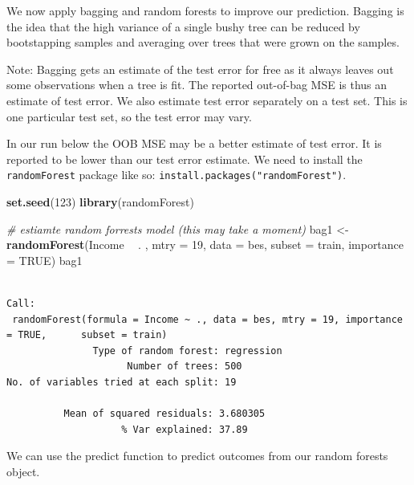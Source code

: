 \documentclass[]{article}
\newenvironment{Shaded}{\begin{snugshade}}{\end{snugshade}}
\newcommand{\CommentTok}[1]{\textcolor[rgb]{0.56,0.35,0.01}{\textit{#1}}}
\newcommand{\DataTypeTok}[1]{\textcolor[rgb]{0.13,0.29,0.53}{#1}}
\newcommand{\DecValTok}[1]{\textcolor[rgb]{0.00,0.00,0.81}{#1}}
\newcommand{\KeywordTok}[1]{\textcolor[rgb]{0.13,0.29,0.53}{\textbf{#1}}}
\newcommand{\NormalTok}[1]{#1}
\newcommand{\OperatorTok}[1]{\textcolor[rgb]{0.81,0.36,0.00}{\textbf{#1}}}
\newcommand{\OtherTok}[1]{\textcolor[rgb]{0.56,0.35,0.01}{#1}}
\newcommand{\StringTok}[1]{\textcolor[rgb]{0.31,0.60,0.02}{#1}}
\begin{document}
We now apply bagging and random forests to improve our prediction. Bagging is the idea that the high variance of a single bushy tree can be reduced by bootstapping samples and averaging over trees that were grown on the samples.

Note: Bagging gets an estimate of the test error for free as it always leaves out some observations when a tree is fit. The reported out-of-bag MSE is thus an estimate of test error. We also estimate test error separately on a test set. This is one particular test set, so the test error may vary.

In our run below the OOB MSE may be a better estimate of test error. It is reported to be lower than our test error estimate. We need to install the \texttt{randomForest} package like so: \texttt{install.packages("randomForest")}.

\begin{Shaded}
\begin{Highlighting}[]
\KeywordTok{set.seed}\NormalTok{(}\DecValTok{123}\NormalTok{)}
\KeywordTok{library}\NormalTok{(randomForest)}

\CommentTok{# estiamte random forrests model (this may take a moment)}
\NormalTok{bag1 <-}\StringTok{ }\KeywordTok{randomForest}\NormalTok{(Income }\OperatorTok{~}\StringTok{ }\NormalTok{. , }\DataTypeTok{mtry =} \DecValTok{19}\NormalTok{, }\DataTypeTok{data =}\NormalTok{ bes, }\DataTypeTok{subset =}\NormalTok{ train, }\DataTypeTok{importance =} \OtherTok{TRUE}\NormalTok{)}
\NormalTok{bag1}
\end{Highlighting}
\end{Shaded}

\begin{verbatim}

Call:
 randomForest(formula = Income ~ ., data = bes, mtry = 19, importance = TRUE,      subset = train) 
               Type of random forest: regression
                     Number of trees: 500
No. of variables tried at each split: 19

          Mean of squared residuals: 3.680305
                    % Var explained: 37.89
\end{verbatim}

We can use the predict function to predict outcomes from our random forests object.

\begin{Shaded}
\end{Shaded}
\end{document}
